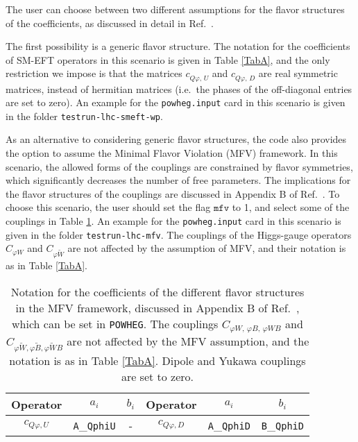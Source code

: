 \documentclass[paper]{JHEP3}
\begin{document}
The user can choose between two different assumptions for the flavor structures of the coefficients, as discussed in detail in Ref.\ \cite{Alioli:2018ljm}.

The first possibility is a generic flavor structure. The notation for the coefficients of SM-EFT operators in this scenario is given in Table \ref{TabA},
and the only restriction we impose is that the matrices $c^{}_{Q\varphi,\, U}$ and $c^{}_{Q\varphi,\, D}$
are real symmetric matrices, instead of hermitian matrices (i.e.\ the phases of the off-diagonal 
entries are set to zero). 
An example for the \texttt{powheg.input}  card in this scenario is given in the folder \texttt{testrun-lhc-smeft-wp}.


As an alternative to considering generic flavor structures, the code also provides the option to assume the Minimal Flavor Violation (MFV) framework. In this scenario, the allowed forms of the couplings are constrained by  flavor symmetries, which significantly decreases the number of free parameters. 
The implications for the flavor structures of the couplings are discussed in Appendix B of Ref.\ \cite{Alioli:2018ljm}.
To choose this scenario, the user should set the flag $\texttt{mfv}$ to 1, and select some of the couplings in Table \ref{tab:mfv}.
An example for the \texttt{powheg.input}  card in this scenario is given in the folder \texttt{testrun-lhc-mfv}. The couplings of the Higgs-gauge operators
$C_{\varphi W}$ and $C_{\varphi \tilde{W}}$ are not affected by the assumption of MFV, and their notation is as in Table
\ref{TabA}.


\begin{table}
\center
\begin{tabular}{||c|c  c|| c | c c || }
\hline
	Operator    & $a_i$ & $b_i$ & Operator & $a_i$ & $b_i$\\\hline
$	c_{Q\varphi,U}$ & \texttt{A}\_\texttt{QphiU} & - &
$	c_{Q\varphi,D}$ & \texttt{A}\_\texttt{QphiD} & \texttt{B}\_\texttt{QphiD}  \\
\hline
\end{tabular}
\caption{Notation for the coefficients of the different flavor structures in the MFV framework, discussed in Appendix B of Ref.\ \cite{Alioli:2018ljm}, which can be set in \texttt{POWHEG}.
The couplings $C_{\varphi W,\, \varphi B, \, \varphi W B}$ and $C_{\varphi \tilde{W},\varphi \tilde{B},\varphi \tilde{W} B}$ are not affected by the MFV assumption, and the notation is as in Table 
\ref{TabA}. Dipole and Yukawa couplings are set to zero.
}\label{tab:mfv}
\end{table}
\end{document}
